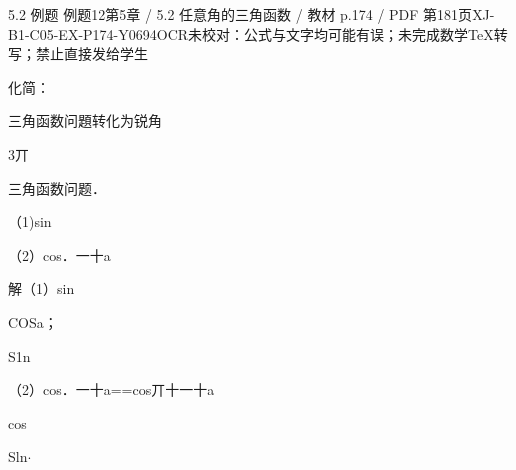 \begin{bankitem}{5.2 例题 例题12}{第5章 / 5.2 任意角的三角函数 / 教材 p.174 / PDF 第181页}{XJ-B1-C05-EX-P174-Y0694}{OCR未校对：公式与文字均可能有误；未完成数学TeX转写；禁止直接发给学生}
\begin{ocrdraft}
\par
化简：
\par
三角函数问題转化为锐角
\par
3丌
\par
三角函数问题．
\par
（1)sin
\par
（2）cos．一十a
\par
解（1）sin
\par
COSa；
\par
S1n
\par
（2）cos．一十a==cos丌十一十a
\par
cos
\par
Sln\ensuremath{\cdot}
\end{ocrdraft}
\end{bankitem}
